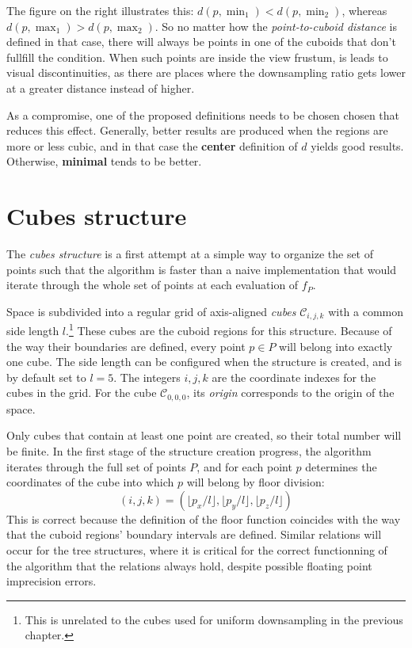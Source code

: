 \documentclass[a4paper,10pt,abstracton,notitlepage]{scrreprt}
\begin{document}
The figure on the right illustrates this: $d(p, \min_{1}) < d(p, \min_{2})$, whereas $d(p, \max_{1}) > d(p, \max_{2})$. So no matter how the \emph{point-to-cuboid distance} is defined in that case, there will always be points in one of the cuboids that don't fullfill the condition. When such points are inside the view frustum, is leads to visual discontinuities, as there are places where the downsampling ratio gets lower at a greater distance instead of higher.

As a compromise, one of the proposed definitions needs to be chosen chosen that reduces this effect. Generally, better results are produced when the regions are more or less cubic, and in that case the \textbf{center} definition of $d$ yields good results. Otherwise, \textbf{minimal} tends to be better.

\pagebreak

\section{Cubes structure}
The \emph{cubes structure} is a first attempt at a simple way to organize the set of points such that the algorithm is faster than a naive implementation that would iterate through the whole set of points at each evaluation of $f_{P}$.

Space is subdivided into a regular grid of axis-aligned \emph{cubes} $\mathcal{C}_{i,j,k}$ with a common side length $l$.\footnote{This is unrelated to the cubes used for uniform downsampling in the previous chapter.} These cubes are the cuboid regions for this structure. Because of the way their boundaries are defined, every point $p \in P$ will belong into exactly one cube. The side length can be configured when the structure is created, and is by default set to $l = 5$. The integers $i, j, k$ are the coordinate indexes for the cubes in the grid. For the cube $\mathcal{C}_{0,0,0}$, its \emph{origin} corresponds to the origin of the space.

Only cubes that contain at least one point are created, so their total number will be finite. In the first stage of the structure creation progress, the algorithm iterates through the full set of points $P$, and for each point $p$ determines the coordinates of the cube into which $p$ will belong by floor division:
\begin{equation*}
	(i, j, k) = \left( \lfloor p_{x}/l \rfloor, \lfloor p_{y}/l \rfloor, \lfloor p_{z}/l \rfloor \right)
\end{equation*}
This is correct because the definition of the floor function coincides with the way that the cuboid regions' boundary intervals are defined. Similar relations will occur for the tree structures, where it is critical for the correct functionning of the algorithm that the relations always hold, despite possible floating point imprecision errors.
\end{document}
